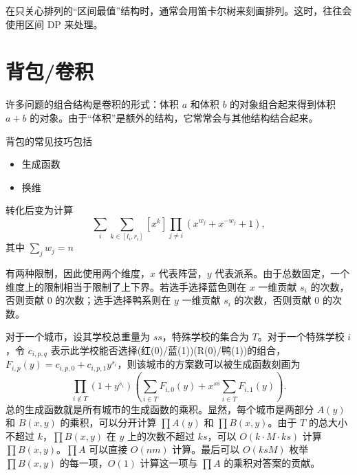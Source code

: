 在只关心排列的“区间最值”结构时，通常会用笛卡尔树来刻画排列。这时，往往会使用区间 DP 来处理。

\begin{example}
    
\end{example}

\begin{example}
    
\end{example}

\section{背包/卷积}

许多问题的组合结构是卷积的形式：体积 $a$ 和体积 $b$ 的对象组合起来得到体积 $a+b$ 的对象。由于“体积”是额外的结构，它常常会与其他结构结合起来。

背包的常见技巧包括
\begin{itemize}
    \item 生成函数
    \item 换维
\end{itemize}



\begin{example}[{[SCOI2009] 粉刷匠}]
    
\end{example}

\begin{example}
    转化后变为计算
    $$
    \sum_i \sum_{k\in [l_i,r_i]} [x^k]\prod_{j\ne i}(x^{w_j}+x^{-w_j}+1),
    $$
    其中 $\sum_j w_j=n$
\end{example}

    
\begin{example}[CF1442D Sum]
    
\end{example}

\begin{example}[{[十二省联考 2019] 皮配}]
    有两种限制，因此使用两个维度，$x$ 代表阵营，$y$ 代表派系。由于总数固定，一个维度上的限制相当于限制了上下界。若选手选择蓝色则在 $x$ 一维贡献 $s_i$ 的次数，否则贡献 $0$ 的次数；选手选择鸭系则在 $y$ 一维贡献 $s_i$ 的次数，否则贡献 $0$ 的次数。

    对于一个城市，设其学校总重量为 $ss$，特殊学校的集合为 $T$。对于一个特殊学校 $i$，令 $c_{i,p,q}$ 表示此学校能否选择(红(0)/蓝(1))(R(0)/鸭(1))的组合，$F_{i,p}(y)=c_{i,p,0}+c_{i,p,1}y^{s_i}$，则该城市的方案数可以被生成函数刻画为
    $$
    \prod_{i\notin T}(1+y^{s_i})\left(\sum_{i\in T}F_{i,0}(y)+x^{ss}\sum_{i\in T}F_{i,1}(y)\right).
    $$
    总的生成函数就是所有城市的生成函数的乘积。显然，每个城市是两部分 $A(y)$ 和 $B(x,y)$ 的乘积，可以分开计算 $\prod A(y)$ 和 $\prod B(x,y)$。由于 $T$ 的总大小不超过 $k$，$\prod B(x,y)$ 在 $y$ 上的次数不超过 $ks$，可以 $O(k\cdot M\cdot ks)$ 计算 $\prod B(x,y)$。$\prod A$ 可以直接 $O(nm)$ 计算。最后可以 $O(ksM)$ 枚举 $\prod B(x,y)$ 的每一项，$O(1)$ 计算这一项与 $\prod A$ 的乘积对答案的贡献。
\end{example}

